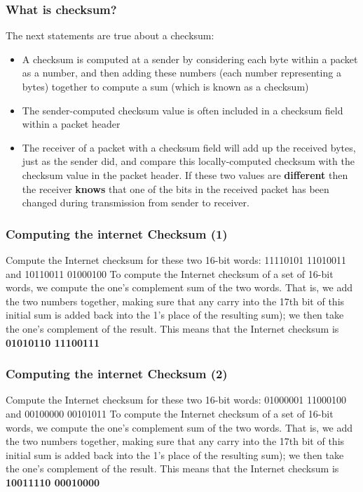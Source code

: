     \subsubsection*{What is checksum?}
    \noindent The next statements are true about a checksum:
    \begin{itemize}
        \item A checksum is computed at a sender by considering each byte within a packet
        as a number, and then adding these numbers (each number representing a bytes)
        together to compute a sum (which is known as a checksum)
        \item The sender-computed checksum value is often included in a checksum field
        within a packet header
        \item The receiver of a packet with a checksum field will add up the received
        bytes, just as the sender did, and compare this locally-computed checksum with the
        checksum value in the packet header. If these two values are \textbf{different}
        then the receiver \textbf{knows} that one of the bits in the received packet has been changed
        during transmission from sender to receiver.
    \end{itemize}

    \subsubsection*{Computing the internet Checksum (1)}
    \noindent Compute the Internet checksum for these two 16-bit words: 11110101 11010011 and 10110011 01000100
    To compute the Internet checksum of a set of 16-bit words, we compute the one's complement sum 
    of the two words. That is, we add the two numbers together, making sure that any carry into the 17th bit
    of this initial sum is added back into the 1's place of the resulting sum); we then take the one's
    complement of the result. This means that the Internet checksum is \textbf{01010110 11100111}

    \subsubsection*{Computing the internet Checksum (2)}
    \noindent Compute the Internet checksum for these two 16-bit words: 01000001 11000100 and 00100000 00101011
    To compute the Internet checksum of a set of 16-bit words, we compute the one's complement sum 
    of the two words. That is, we add the two numbers together, making sure that any carry into the 17th bit
    of this initial sum is added back into the 1's place of the resulting sum); we then take the one's
    complement of the result. This means that the Internet checksum is \textbf{10011110 00010000}

